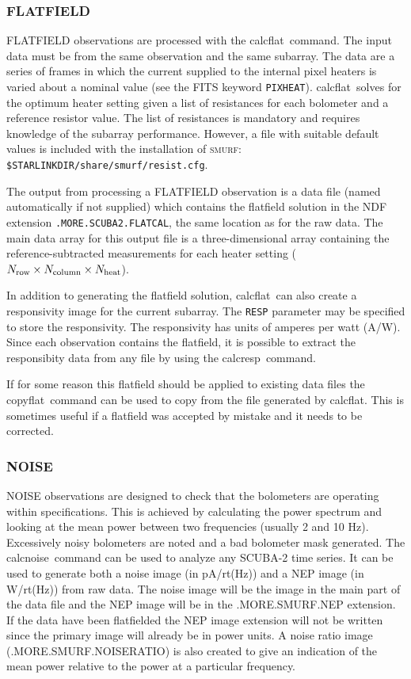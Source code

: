 \documentclass[twoside,11pt]{article}
\newcommand{\xref}[3]{#1}
\newcommand{\xlabel}[1]{}
\renewcommand{\_}{\texttt{\symbol{95}}}
\newcommand{\SMURF}{\textsc{smurf}}
\newcommand{\task}[1]{\textsf{#1}}
\newcommand{\calcflat}{\xref{\task{calcflat}}{sun258}{CALCFLAT}}
\newcommand{\calcnoise}{\xref{\task{calcnoise}}{sun258}{CALCNOISE}}
\newcommand{\calcresp}{\xref{\task{calcresp}}{sun258}{CALCRESP}}
\newcommand{\copyflat}{\xref{\task{copyflat}}{sun258}{COPYFLAT}}
\newcommand{\aparam}[1]{\texttt{#1}}     %
\begin{document}
\subsubsection{\xlabel{flatcal}FLATFIELD\label{se:flatcal}}

FLATFIELD observations are processed with the \calcflat\ command. The
input data must be from the same observation and the same
subarray. The data are a series of frames in which the current
supplied to the internal pixel heaters is varied about a nominal value
(see the FITS keyword \texttt{PIXHEAT}). \calcflat\ solves for the
optimum heater setting given a list of resistances for each bolometer
and a reference resistor value. The list of resistances is mandatory
and requires knowledge of the subarray performance. However, a file
with suitable default values is included with the installation of
\SMURF: \texttt{\$STARLINK\_DIR/share/smurf/resist.cfg}.

The output from processing a FLATFIELD observation is a data file
(named automatically if not supplied) which contains the flatfield
solution in the NDF extension \texttt{.MORE.SCUBA2.FLATCAL}, the same
location as for the raw data. The main data array for this output file
is a three-dimensional array containing the reference-subtracted
measurements for each heater setting ($N_{\rm row}\times N_{\rm
  column} \times N_{\rm heat}$).

In addition to generating the flatfield solution, \calcflat\ can also
create a responsivity image for the current subarray. The
\aparam{RESP} parameter may be specified to store the
responsivity. The responsivity has units of amperes per watt
(A/W). Since each observation contains the flatfield, it is possible
to extract the responsibity data from any file by using the \calcresp\
command.

If for some reason this flatfield should be applied to existing data
files the \copyflat\ command can be used to copy from the file
generated by \calcflat. This is sometimes useful if a flatfield was
accepted by mistake and it needs to be corrected.

\subsubsection{NOISE}

NOISE observations are designed to check that the bolometers are
operating within specifications. This is achieved by calculating the
power spectrum and looking at the mean power between two frequencies
(usually 2 and 10 Hz). Excessively noisy bolometers are noted and a bad
bolometer mask generated.  The \calcnoise\ command can be used to
analyze any SCUBA-2 time series. It can be used to generate both a
noise image (in pA/rt(Hz)) and a NEP image (in W/rt(Hz)) from raw
data. The noise image will be the image in the main part of the data
file and the NEP image will be in the .MORE.SMURF.NEP extension. If
the data have been flatfielded the NEP image extension will not be
written since the primary image will already be in power units. A
noise ratio image (.MORE.SMURF.NOISERATIO) is also created to give an
indication of the mean power relative to the power at a particular frequency.
\end{document}
